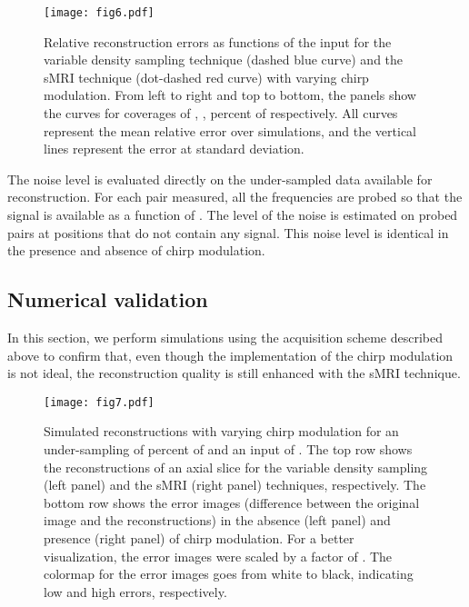 \documentclass[10pt,draftcls, onecolumn]{IEEEtran}
\begin{document}
\begin{figure}
\centering
\texttt{[image: fig6.pdf]}
\caption{\label{fig:curves error 3D} Relative reconstruction errors as functions of the input  for the variable density sampling technique (dashed blue curve) and the sMRI technique (dot-dashed red curve) with varying chirp modulation. From left to right and top to bottom, the panels show the curves for coverages of , ,  percent of  respectively. All curves represent the mean relative error over  simulations, and the vertical lines represent the error at  standard deviation.}
\vspace{-3mm}
\end{figure}


The noise level is evaluated directly on the under-sampled data available for reconstruction. For each  pair measured, all the frequencies  are probed so that the signal is available as a function of . The level of the noise is estimated on probed pairs  at positions  that do not contain any signal. This noise level is identical in the presence and absence of chirp modulation.


\subsection{Numerical validation}
\label{sub:numerical experiments}

In this section, we perform simulations using the acquisition scheme described above to confirm that, even though the implementation of the chirp modulation is not ideal, the reconstruction quality is still enhanced with the sMRI technique.

\begin{figure}
\centering
\texttt{[image: fig7.pdf]}
\caption{\label{fig:simulated reconstruction 3D} Simulated reconstructions with varying chirp modulation for an under-sampling of  percent of  and an input  of . The top row shows the reconstructions of an axial slice for the variable density sampling (left panel) and the sMRI (right panel) techniques, respectively. The bottom row shows the error images (difference between the original image and the reconstructions) in the absence (left panel) and presence (right panel) of chirp modulation. For a better visualization, the error images were scaled by a factor of . The colormap for the error images goes from white to black, indicating low and high errors, respectively.}
\vspace{-3mm}
\end{figure}
\end{document}
